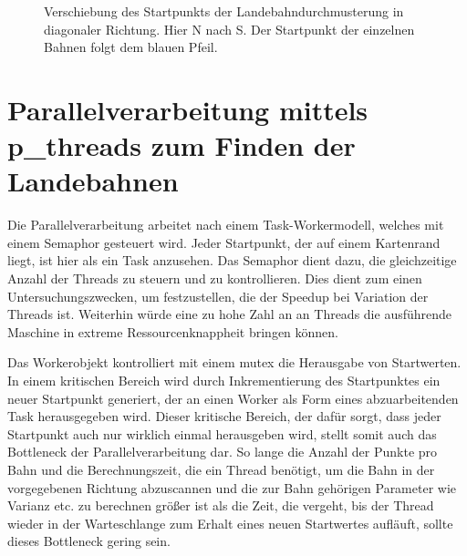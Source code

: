 \documentclass[10pt,a4paper]{report}
\begin{document}
\begin{figure}\label{scanortho}
\centering
{}
\caption{Verschiebung des Startpunkts der Landebahndurchmusterung in diagonaler Richtung. Hier N nach S. Der Startpunkt der einzelnen Bahnen folgt dem blauen Pfeil.}
\end{figure}
\section{Parallelverarbeitung mittels p\_threads zum Finden der Landebahnen}

Die Parallelverarbeitung arbeitet nach einem Task-Workermodell, welches mit einem Semaphor gesteuert wird. Jeder Startpunkt, der auf einem Kartenrand liegt, ist hier als ein Task anzusehen. Das Semaphor dient dazu, die gleichzeitige Anzahl der Threads zu steuern und zu kontrollieren. Dies dient zum einen Untersuchungszwecken, um festzustellen, die der Speedup bei Variation der Threads ist. Weiterhin würde eine zu hohe Zahl an an Threads die ausführende Maschine in extreme Ressourcenknappheit bringen können.

Das Workerobjekt kontrolliert mit einem mutex die Herausgabe von Startwerten. In einem kritischen Bereich wird durch Inkrementierung des Startpunktes ein neuer Startpunkt generiert, der an einen Worker als Form eines abzuarbeitenden Task herausgegeben wird. Dieser kritische Bereich, der dafür sorgt, dass jeder Startpunkt auch nur wirklich einmal herausgeben wird, stellt somit auch das Bottleneck der Parallelverarbeitung dar. So lange die Anzahl der Punkte pro Bahn und die Berechnungszeit, die ein Thread benötigt, um die Bahn in der vorgegebenen Richtung abzuscannen und die zur Bahn gehörigen Parameter wie Varianz etc. zu berechnen größer ist als die Zeit, die vergeht, bis der Thread wieder in der Warteschlange zum Erhalt eines neuen Startwertes aufläuft, sollte dieses Bottleneck gering sein.
\end{document}
